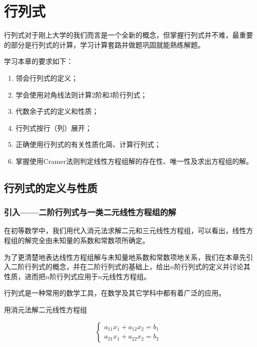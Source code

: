 \chapter{行列式}

行列式对于刚上大学的我们而言是一个全新的概念，但掌握行列式并不难，最重要的部分是行列式的计算，学习计算套路并做题巩固就能熟练解题。

学习本章的要求如下：

\begin{enumerate}
    \item 领会行列式的定义；
    \item 学会使用对角线法则计算2阶和3阶行列式；
    \item 代数余子式的定义和性质；
    \item 行列式按行（列）展开；
    \item 正确使用行列式的有关性质化简、计算行列式；
    \item 掌握使用Cramer法则判定线性方程组解的存在性、唯一性及求出方程组的解。
\end{enumerate}

\section{行列式的定义与性质}

\subsection{引入——二阶行列式与一类二元线性方程组的解}

在初等数学中，我们用代入消元法求解二元和三元线性方程组，可以看出，线性方程组的解完全由未知量的系数和常数项所确定。

为了更清楚地表达线性方程组解与未知量地系数和常数项地关系，我们在本章先引入二阶行列式的概念，并在二阶行列式的基础上，给出$n$阶行列式的定义并讨论其性质，进而把$n$阶行列式应用于$n$元线性方程组。

行列式是一种常用的数学工具，在数学及其它学科中都有着广泛的应用。

\begin{example}
    用消元法解二元线性方程组

    \begin{equation}
        \left\{
        \begin{array}{c}
            a_{11}x_1+a_{12}x_2=b_1 \\
            a_{21}x_1+a_{22}x_2=b_2
        \end{array}
        \right.\label{eq1.1}
    \end{equation}
\end{example}

